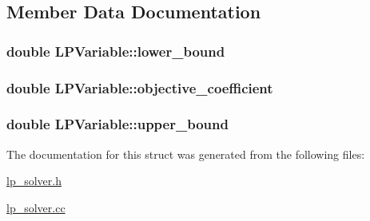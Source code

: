 \subsection{Member Data Documentation}
\hypertarget{structLPVariable_ad585cb11eed3d2e2623c02c670defaaa}{
\subsubsection[{lower\-\_\-bound}]{\setlength{\rightskip}{0pt plus 5cm}double L\-P\-Variable\-::lower\-\_\-bound}}\label{structLPVariable_ad585cb11eed3d2e2623c02c670defaaa}
\hypertarget{structLPVariable_a3976a252d9778f6a1f9fceed83818f73}{
\subsubsection[{objective\-\_\-coefficient}]{\setlength{\rightskip}{0pt plus 5cm}double L\-P\-Variable\-::objective\-\_\-coefficient}}\label{structLPVariable_a3976a252d9778f6a1f9fceed83818f73}
\hypertarget{structLPVariable_ab4b0c61c0cdc96074a321ae1a208dfc8}{
\subsubsection[{upper\-\_\-bound}]{\setlength{\rightskip}{0pt plus 5cm}double L\-P\-Variable\-::upper\-\_\-bound}}\label{structLPVariable_ab4b0c61c0cdc96074a321ae1a208dfc8}


The documentation for this struct was generated from the following files\-:\begin{DoxyCompactItemize}
\item 
\hyperlink{lp__solver_8h}{lp\-\_\-solver.\-h}\item 
\hyperlink{lp__solver_8cc}{lp\-\_\-solver.\-cc}\end{DoxyCompactItemize}
